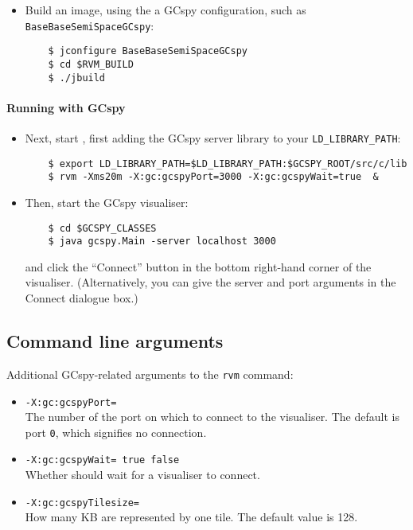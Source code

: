 \begin{itemize}
  \item Build an image, using the a GCspy configuration, such as
    \texttt{BaseBaseSemiSpaceGCspy}: 
\begin{verbatim}
    $ jconfigure BaseBaseSemiSpaceGCspy
    $ cd $RVM_BUILD
    $ ./jbuild
\end{verbatim}
\end{itemize}

\paragraph{Running \jrvm{} with GCspy}

\begin{itemize}
   \item  Next, start \jrvm{}, first adding the GCspy server library to your {\tt LD\_LIBRARY\_PATH}:
\begin{verbatim}
    $ export LD_LIBRARY_PATH=$LD_LIBRARY_PATH:$GCSPY_ROOT/src/c/lib
    $ rvm -Xms20m -X:gc:gcspyPort=3000 -X:gc:gcspyWait=true  &
\end{verbatim}

   \item Then, start the GCspy visualiser:

\begin{verbatim}
    $ cd $GCSPY_CLASSES
    $ java gcspy.Main -server localhost 3000
\end{verbatim}

      and click the ``Connect'' button in the bottom right-hand corner
      of the visualiser.  (Alternatively, you can give the server and
      port arguments in the Connect dialogue box.)  

\end{itemize}

\subsection{Command line arguments}

Additional GCspy-related arguments to the \texttt{rvm} command:

\begin{itemize}

\item {\tt -X:gc:gcspyPort=} \\
    The number of the port on which to connect to the visualiser.  The
    default is port \texttt{0}, which signifies no connection. 

\item {\tt -X:gc:gcspyWait=\Mlbr{} \mbox{\texttt{true}} \Mor{} \mbox{\texttt{false}} \Mrbr} \\
    Whether \jrvm{} should wait for a visualiser to connect.

\item {\tt -X:gc:gcspyTilesize=} \\
    How many KB are represented by one tile.  The default value is 128.

\end{itemize}

